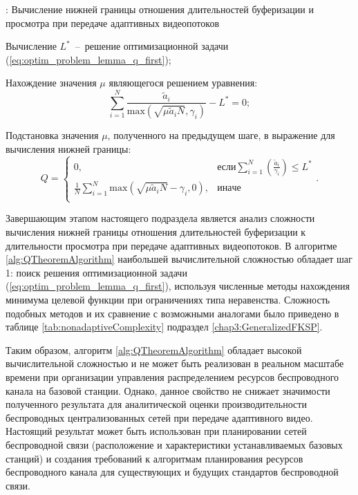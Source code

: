 \begin{algorithm}
  \caption{: Вычисление нижней границы отношения длительностей буферизации и просмотра при передаче адаптивных видеопотоков}
	\label{alg:QTheoremAlgorithm}
  \begin{algorithmic}[1]
	 \item Вычисление $L^{*}$~--~решение оптимизационной задачи (\ref{eq:optim_problem_lemma_q_first});
	 \item Нахождение значения $\mu$ являющегося решением уравнения: $$\sum\limits_{i=1}^{N} {\frac{\tilde{a}_i}{\mathrm{max} \left(\sqrt{\mu \tilde{a}_i N}, \gamma_i\right)}} - L^{*} = 0;$$
	\item Подстановка значения $\mu$, полученного на предыдущем шаге, в выражение для вычисления нижней границы:
	$$Q =
	\begin{cases}
	0, & \text{если} \sum\limits_{i=1}^{N} {\left(\frac{\tilde{a}_i}{\gamma_i}\right)} \leq L^{*}\\
	\frac{1}{N} \sum\limits_{i=1}^{N} {\mathrm{max} \left(\sqrt{\mu \tilde{a}_i N}-\gamma_i, 0\right)}, & \mathrm{иначе} \\
	\end{cases}.$$
  \end{algorithmic}
\end{algorithm}

Завершающим этапом настоящего подраздела является анализ сложности вычисления нижней границы отношения длительностей буферизации к длительности просмотра при передаче адаптивных видеопотоков. В алгоритме \ref{alg:QTheoremAlgorithm} наибольшей вычислительной сложностью обладает шаг 1: поиск решения оптимизационной задачи (\ref{eq:optim_problem_lemma_q_first}), используя численные методы нахождения минимума целевой функции при ограничениях типа неравенства. Сложность подобных методов и их сравнение с возможными аналогами было приведено в таблице \ref{tab:nonadaptiveComplexity} подраздел \ref{chap3:GeneralizedFKSP}.

Таким образом, алгоритм \ref{alg:QTheoremAlgorithm} обладает высокой вычислительной сложностью и не может быть реализован в реальном масштабе времени при организации управления распределением ресурсов беспроводного канала на базовой станции. Однако, данное свойство не снижает значимости полученного результата для аналитической оценки производительности беспроводных централизованных сетей при передаче адаптивного видео. Настоящий результат может быть использован при планировании сетей беспроводной связи (расположение и характеристики устанавливаемых базовых станций) и создания требований к алгоритмам планирования ресурсов беспроводного канала для существующих и будущих стандартов беспроводной связи.

